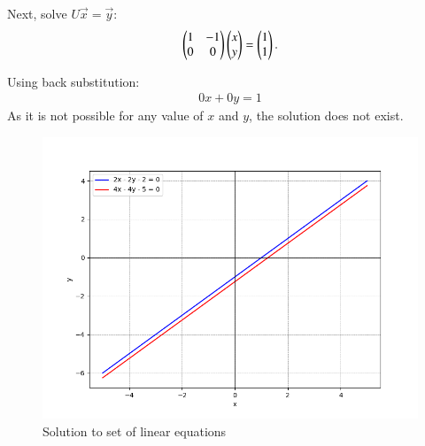 \documentclass[journal]{IEEEtran}
\begin{document}
Next, solve $U\vec{x} = \vec{y}$:
\begin{align}
    \begin{pmatrix}1 & -1 \\ 0 & 0\end{pmatrix} \begin{pmatrix}x \\ y\end{pmatrix} = \begin{pmatrix}1 \\ 1\end{pmatrix}.
\end{align}

Using back substitution:
\begin{align}
	0x+0y = 1
\end{align}
As it is not possible for any value of $x$ and $y$, the solution does not exist.

\begin{figure}[h!]
   \centering
   \includegraphics[width=1\columnwidth]{figs/fig.png}
    \caption{Solution to set of linear equations}
\end{figure}
\end{document}

